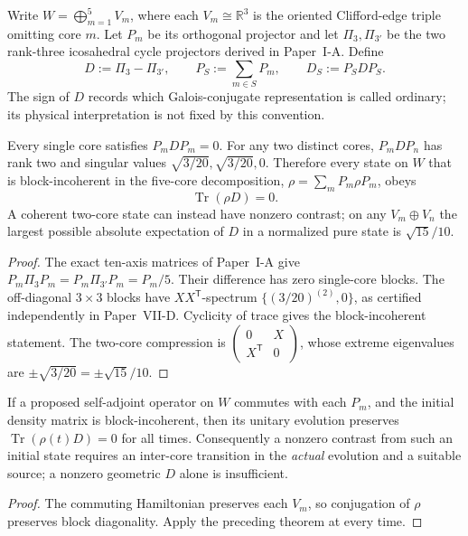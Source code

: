 \documentclass[12pt,a4paper]{article}
\begin{document}
\begin{definition}
\label{p10:def:v323-petersen-strong-contrast}
Write $W=\bigoplus_{m=1}^5 V_m$, where each $V_m\cong\mathbb R^3$
is the oriented Clifford-edge triple omitting core $m$.  Let $P_m$ be
its orthogonal projector and let $\Pi_3,\Pi_{3'}$ be the two rank-three
icosahedral cycle projectors derived in Paper~I-A. Define
\[
 D:=\Pi_3-\Pi_{3'},\qquad
 P_S:=\sum_{m\in S}P_m,\qquad D_S:=P_SDP_S.
\]
The sign of $D$ records which Galois-conjugate representation is called
ordinary; its physical interpretation is not fixed by this convention.
\end{definition}

\begin{theorem}
\label{p10:thm:v323-first-coherent-mirror-source}
Every single core satisfies $P_mDP_m=0$.  For any two distinct cores,
$P_mDP_n$ has rank two and singular values
$\sqrt{3/20},\sqrt{3/20},0$. Therefore every state on $W$ that is
block-incoherent in the five-core decomposition,
$\rho=\sum_mP_m\rho P_m$, obeys
\[
 \operatorname{Tr}(\rho D)=0.
\]
A coherent two-core state can instead have nonzero contrast; on any
$V_m\oplus V_n$ the largest possible absolute expectation of $D$ in
a normalized pure state is $\sqrt{15}/10$.
\end{theorem}
\begin{proof}
The exact ten-axis matrices of Paper~I-A give
$P_m\Pi_3P_m=P_m\Pi_{3'}P_m=P_m/5$.  Their difference has zero
single-core blocks.  The off-diagonal $3\times3$ blocks have
$XX^{\mathsf T}$-spectrum $\{(3/20)^{(2)},0\}$, as certified
independently in Paper~VII-D.  Cyclicity of trace gives the
block-incoherent statement.  The two-core compression is
$\left(\begin{smallmatrix}0&X\\X^{\mathsf T}&0\end{smallmatrix}\right)$,
whose extreme eigenvalues are $\pm\sqrt{3/20}=\pm\sqrt{15}/10$.
\end{proof}

\begin{corollary}
\label{p10:cor:v323-incoherent-evolution}
If a proposed self-adjoint operator on $W$ commutes with each $P_m$,
and the initial density matrix is block-incoherent, then its unitary
evolution preserves $\operatorname{Tr}(\rho(t)D)=0$ for all times.
Consequently a nonzero contrast from such an initial state requires
an inter-core transition in the \emph{actual} evolution and a suitable
source; a nonzero geometric $D$ alone is insufficient.
\end{corollary}
\begin{proof}
The commuting Hamiltonian preserves each $V_m$, so conjugation of
$\rho$ preserves block diagonality. Apply the preceding theorem at
every time.
\end{proof}
\end{document}
